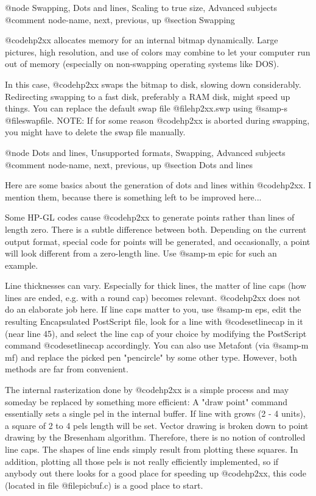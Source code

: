 @node Swapping, Dots and lines, Scaling to true size, Advanced subjects
@comment  node-name,  next,  previous,  up
@section Swapping

@code{hp2xx} allocates memory for an internal bitmap dynamically.
Large pictures, high resolution, and use of colors may combine to
let your computer run out of memory (especially on non-swapping operating
systems like DOS).

In this case, @code{hp2xx} swaps the bitmap to disk, slowing down
considerably. Redirecting swapping to a fast disk, preferably a RAM disk,
might speed up things. You can replace the default swap file
@file{hp2xx.swp} using @samp{-s @file{swapfile}}.
NOTE: If for some reason @code{hp2xx} is aborted during swapping, you might
have to delete the swap file manually.





@node Dots and lines, Unsupported formats, Swapping, Advanced subjects
@comment  node-name,  next,  previous,  up
@section Dots and lines

Here are some basics about the generation of dots and lines within
@code{hp2xx}. I mention them, because there is something left to be
improved here...

Some HP-GL codes cause @code{hp2xx} to generate points rather than lines
of length zero. There is a subtle difference between both. Depending
on the current output format, special code for points will be generated,
and occasionally, a point will look different from a zero-length line.
Use @samp{-m epic} for such an example.

Line thicknesses can vary. Especially for thick lines, the matter of
line caps (how lines are ended, e.g. with a round cap) becomes relevant.
@code{hp2xx} does not do an elaborate job here. If line caps matter to you,
use @samp{-m eps}, edit the resulting Encapsulated PostScript file, look
for a line with @code{setlinecap} in it (near line 45), and select the
line cap of your choice by modifying the PostScript command @code{setlinecap}
accordingly. You can also use Metafont (via @samp{-m mf}) and replace
the picked pen "pencircle" by some other type. However, both methods
are far from convenient.

The internal rasterization done by @code{hp2xx} is a simple process
and may someday be replaced by something more efficient: A "draw point"
command essentially sets a single pel in the internal buffer.
If line with grows (2 - 4 units), a square of 2 to 4 pels length will
be set. Vector drawing is broken down to point drawing by the
Bresenham algorithm. Therefore, there is no notion of controlled
line caps. The shapes of line ends simply result from plotting these squares.
In addition, plotting all those pels is not really efficiently implemented,
so if anybody out there looks for a good place for speeding up @code{hp2xx},
this code (located in file @file{picbuf.c}) is a good place to start.

